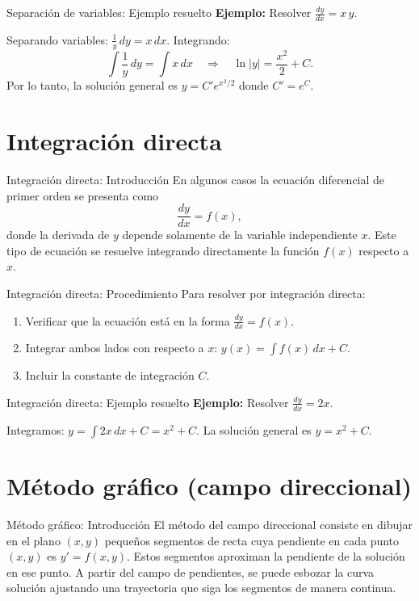 \documentclass{beamer}
\begin{document}
\begin{frame}{Separación de variables: Ejemplo resuelto}
\textbf{Ejemplo:} Resolver $\displaystyle\frac{dy}{dx} = x\,y$.

Separando variables: $\displaystyle \frac{1}{y}\,dy = x\,dx$. Integrando:
\[
\int \frac{1}{y}\,dy = \int x\,dx \quad\Longrightarrow\quad \ln|y| = \frac{x^2}{2} + C.
\]
Por lo tanto, la solución general es $y = C' e^{x^2/2}$ donde $C' = e^C$.
\end{frame}

\section*{Integración directa}
\begin{frame}{Integración directa: Introducción}
En algunos casos la ecuación diferencial de primer orden se presenta como
\[
\frac{dy}{dx} = f(x),
\]
donde la derivada de $y$ depende solamente de la variable independiente $x$. Este tipo de ecuación se resuelve integrando directamente la función $f(x)$ respecto a $x$.
\end{frame}

\begin{frame}{Integración directa: Procedimiento}
Para resolver por integración directa:
\begin{enumerate}
  \item Verificar que la ecuación está en la forma $\displaystyle \frac{dy}{dx} = f(x)$.
  \item Integrar ambos lados con respecto a $x$: $y(x) = \displaystyle \int f(x)\,dx + C$.
  \item Incluir la constante de integración $C$.
\end{enumerate}
\end{frame}

\begin{frame}{Integración directa: Ejemplo resuelto}
\textbf{Ejemplo:} Resolver $\displaystyle\frac{dy}{dx} = 2x$.

Integramos: $y = \int 2x\,dx + C = x^2 + C$. La solución general es $y = x^2 + C$.
\end{frame}

\section*{Método gráfico (campo direccional)}
\begin{frame}{Método gráfico: Introducción}
El método del campo direccional consiste en dibujar en el plano $(x,y)$ pequeños segmentos de recta cuya pendiente en cada punto $(x,y)$ es $y'=f(x,y)$. Estos segmentos aproximan la pendiente de la solución en ese punto. A partir del campo de pendientes, se puede esbozar la curva solución ajustando una trayectoria que siga los segmentos de manera continua.
\end{frame}
\end{document}
